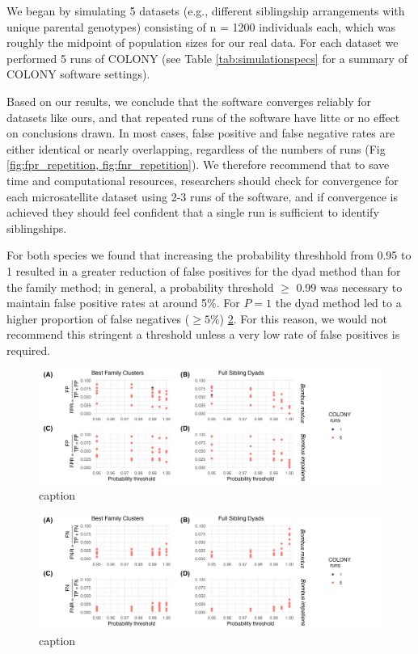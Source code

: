 \documentclass[12pt]{article}
\begin{document}
We began by simulating 5 datasets (e.g., different siblingship arrangements with unique parental genotypes) consisting of n = 1200 individuals each, which was roughly the midpoint of population sizes for our real data. For each dataset we performed 5 runs of COLONY (see Table \ref{tab:simulationspecs} for a summary of COLONY software settings).

Based on our results, we conclude that the software converges reliably for datasets like ours, and that repeated runs of the software have litte or no effect on conclusions drawn. In most cases, false positive and false negative rates are either identical or nearly overlapping, regardless of the numbers of runs (Fig \ref{fig:fpr_repetition, fig:fnr_repetition}). We therefore recommend that to save time and computational resources, researchers should check for convergence for each microsatellite dataset using 2-3 runs of the software, and if convergence is achieved they should feel confident that a single run is sufficient to identify siblingships.

For both species we found that increasing the probability threshhold from 0.95 to 1 resulted in a greater reduction of false positives for the dyad method than for the family method; in general, a probability threshold $\ge$ 0.99 was necessary to maintain false positive rates at around 5\%. For $P = 1$ the dyad method led to a higher proportion of false negatives ($\ge 5\%$) \ref{fig:fnr_repetition}. For this reason, we would not recommend this stringent a threshold unless a very low rate of false positives is required.

\begin{figure}[H]
    \centering
    \includegraphics[width=\linewidth]{appendix_figures/fpr_repetition.jpg}
    \caption{caption}
    \label{fig:fpr_repetition}
\end{figure}

\begin{figure}[H]
    \centering
    \includegraphics[width=\linewidth]{appendix_figures/fnr_repetition.jpg}
    \caption{caption}
    \label{fig:fnr_repetition}
\end{figure}
\end{document}
